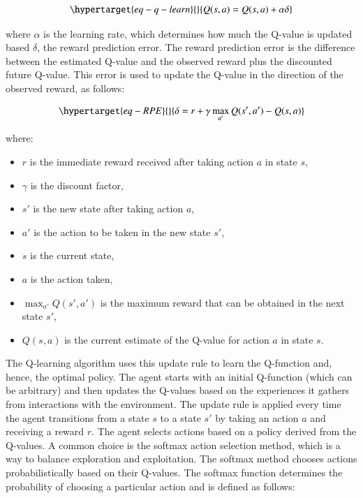 \documentclass[
  number,
  preprint,
  3p,
  onecolumn]{elsarticle}
\begin{document}
\begin{equation}\protect\hypertarget{eq-q-learn}{}{
Q(s, a) = Q(s, a) + \alpha \delta
}\label{eq-q-learn}\end{equation}

where \(\alpha\) is the learning rate, which determines how much the
Q-value is updated based \(\delta\), the reward prediction error. The
reward prediction error is the difference between the estimated Q-value
and the observed reward plus the discounted future Q-value. This error
is used to update the Q-value in the direction of the observed reward,
as follows:

\begin{equation}\protect\hypertarget{eq-RPE}{}{
\delta = r + \gamma \max_{a'} Q(s', a') - Q(s, a)
}\label{eq-RPE}\end{equation}

where:

\begin{itemize}
\item
  \(r\) is the immediate reward received after taking action \(a\) in
  state \(s\),
\item
  \(\gamma\) is the discount factor,
\item
  \(s'\) is the new state after taking action \(a\),
\item
  \(a'\) is the action to be taken in the new state \(s'\),
\item
  \(s\) is the current state,
\item
  \(a\) is the action taken,
\item
  \(\max_{a'} Q(s', a')\) is the maximum reward that can be obtained in
  the next state \(s'\),
\item
  \(Q(s, a)\) is the current estimate of the Q-value for action \(a\) in
  state \(s\).
\end{itemize}

The Q-learning algorithm uses this update rule to learn the Q-function
and, hence, the optimal policy. The agent starts with an initial
Q-function (which can be arbitrary) and then updates the Q-values based
on the experiences it gathers from interactions with the environment.
The update rule is applied every time the agent transitions from a state
\(s\) to a state \(s'\) by taking an action \(a\) and receiving a reward
\(r\). The agent selects actions based on a policy derived from the
Q-values. A common choice is the softmax action selection method, which
is a way to balance exploration and exploitation. The softmax method
chooses actions probabilistically based on their Q-values. The softmax
function determines the probability of choosing a particular action and
is defined as follows:
\end{document}
